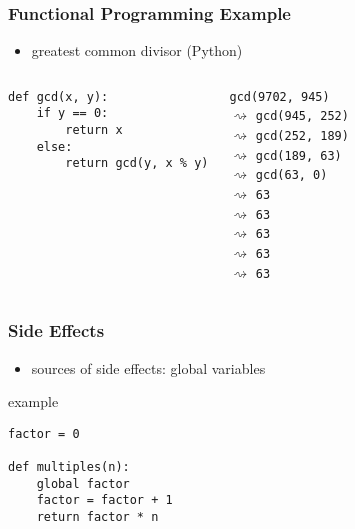 \documentclass[dvipsnames]{beamer}
\theoremstyle{plain}
\begin{document}
\begin{frame}[fragile]
  \frametitle{Functional Programming Example}

  \begin{itemize}
    \item greatest common divisor (Python)
  \end{itemize}

  \medskip
  \begin{columns}
    \begin{lstlisting}
def gcd(x, y):
    if y == 0:
        return x
    else:
        return gcd(y, x % y)
    \end{lstlisting}

    \lstinline{gcd(9702, 945)}\\
    $\rightsquigarrow$ \lstinline{gcd(945, 252)}\\
    \hspace{16pt}$\rightsquigarrow$ \lstinline{gcd(252, 189)}\\
    \hspace{32pt}$\rightsquigarrow$ \lstinline{gcd(189, 63)}\\
    \hspace{48pt}$\rightsquigarrow$ \lstinline{gcd(63, 0)}\\
    \hspace{64pt}$\rightsquigarrow$ \lstinline{63}\\
    \hspace{48pt}$\rightsquigarrow$ \lstinline{63}\\
    \hspace{32pt}$\rightsquigarrow$ \lstinline{63}\\
    \hspace{16pt}$\rightsquigarrow$ \lstinline{63}\\
    $\rightsquigarrow$ \lstinline{63}
  \end{columns}
\end{frame}

\begin{frame}[fragile]
  \frametitle{Side Effects}

  \begin{itemize}
    \item sources of side effects: global variables
  \end{itemize}

  \begin{exampleblock}{example}
    \begin{lstlisting}
factor = 0

def multiples(n):
    global factor
    factor = factor + 1
    return factor * n
    \end{lstlisting}
  \end{exampleblock}
\end{frame}
\end{document}

